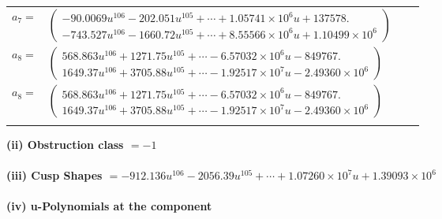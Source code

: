 \documentclass[1p]{elsarticle_modified}
\theoremstyle{definition}
\begin{document}
\begin{tabular}{m{7pt} m{180pt} m{7pt} m{180pt} }
\flushright $a_{7}=$&$\begin{pmatrix}-90.0069 u^{106}-202.051 u^{105}+\cdots+1.05741\times10^{6} u+137578.\\-743.527 u^{106}-1660.72 u^{105}+\cdots+8.55566\times10^{6} u+1.10499\times10^{6}\end{pmatrix}$ \\
\flushright $a_{8}=$&$\begin{pmatrix}568.863 u^{106}+1271.75 u^{105}+\cdots-6.57032\times10^{6} u-849767.\\1649.37 u^{106}+3705.88 u^{105}+\cdots-1.92517\times10^{7} u-2.49360\times10^{6}\end{pmatrix}$\\ \flushright $a_{8}=$&$\begin{pmatrix}568.863 u^{106}+1271.75 u^{105}+\cdots-6.57032\times10^{6} u-849767.\\1649.37 u^{106}+3705.88 u^{105}+\cdots-1.92517\times10^{7} u-2.49360\times10^{6}\end{pmatrix}$\\&\end{tabular}
\flushleft \textbf{(ii) Obstruction class $= -1$}\\~\\
\flushleft \textbf{(iii) Cusp Shapes $= -912.136 u^{106}-2056.39 u^{105}+\cdots+1.07260\times10^{7} u+1.39093\times10^{6}$}\\~\\
\newpage\renewcommand{\arraystretch}{1}
\flushleft \textbf{(iv) u-Polynomials at the component}\newline \\
\end{document}
